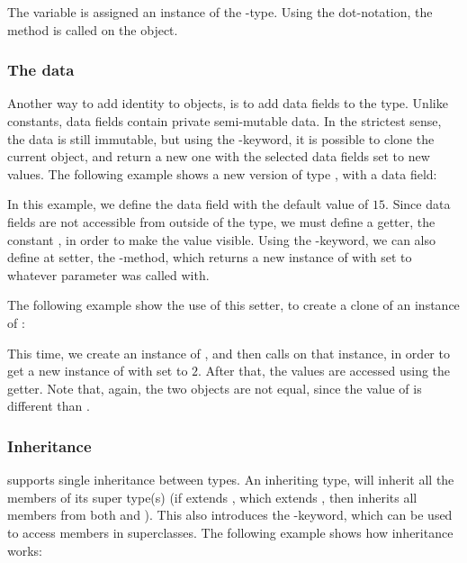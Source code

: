
The variable  is assigned an instance of the -type. Using
the dot-notation, the method  is called on the object.

\subsubsection{The data}

Another way to add identity to objects, is to add data fields to the type.
Unlike constants, data fields contain private semi-mutable data. In the
strictest sense, the data is still immutable, but using the
-keyword, it is possible to clone the current object, and return a
new one with the selected data fields set to new values. The following example
shows a new version of type , with a data field:


In this example, we define the data field  with the default value
of $15$. Since data fields are not accessible from outside of the type, we must
define a getter, the constant , in order to make the value
visible. Using the -keyword, we can also define at setter, the
-method, which returns a new instance of  with
 set to whatever parameter  was called with.

The following example show the use of this setter, to create a clone of an
instance of :


This time, we create an instance of , and then calls 
on that instance, in order to get a new instance of  with 
set to $2$. After that, the values are accessed using the getter. Note that,
again, the two objects are not equal, since the value of  is
different than .

\subsubsection{Inheritance}


\productname{} supports single inheritance between types. An inheriting type, will
inherit all the members of its super type(s) (if  extends , which
extends , then  inherits all members from both  and ).
This also introduces the -keyword, which can be used to access members
in superclasses. The following example shows how inheritance works:

